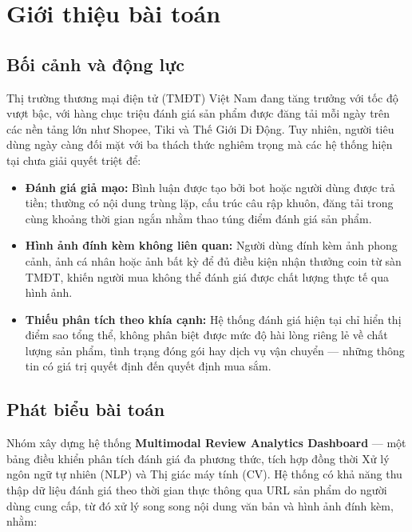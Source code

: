 \section{Giới thiệu bài toán}

\subsection{Bối cảnh và động lực}

Thị trường thương mại điện tử (TMĐT) Việt Nam đang tăng trưởng với tốc độ vượt bậc, với hàng chục triệu đánh giá sản phẩm được đăng tải mỗi ngày trên các nền tảng lớn như Shopee, Tiki và Thế Giới Di Động. Tuy nhiên, người tiêu dùng ngày càng đối mặt với ba thách thức nghiêm trọng mà các hệ thống hiện tại chưa giải quyết triệt để:

\begin{itemize}[labelsep=10pt, leftmargin=2cm]
    \item \textbf{Đánh giá giả mạo:} Bình luận được tạo bởi bot hoặc người dùng được trả tiền; thường có nội dung trùng lặp, cấu trúc câu rập khuôn, đăng tải trong cùng khoảng thời gian ngắn nhằm thao túng điểm đánh giá sản phẩm.
    \item \textbf{Hình ảnh đính kèm không liên quan:} Người dùng đính kèm ảnh phong cảnh, ảnh cá nhân hoặc ảnh bất kỳ để đủ điều kiện nhận thưởng coin từ sàn TMĐT, khiến người mua không thể đánh giá được chất lượng thực tế qua hình ảnh.
    \item \textbf{Thiếu phân tích theo khía cạnh:} Hệ thống đánh giá hiện tại chỉ hiển thị điểm sao tổng thể, không phân biệt được mức độ hài lòng riêng lẻ về chất lượng sản phẩm, tình trạng đóng gói hay dịch vụ vận chuyển --- những thông tin có giá trị quyết định đến quyết định mua sắm.
\end{itemize}

\subsection{Phát biểu bài toán}

Nhóm xây dựng hệ thống \textbf{Multimodal Review Analytics Dashboard} --- một bảng điều khiển phân tích đánh giá đa phương thức, tích hợp đồng thời Xử lý ngôn ngữ tự nhiên (NLP) và Thị giác máy tính (CV). Hệ thống có khả năng thu thập dữ liệu đánh giá theo thời gian thực thông qua URL sản phẩm do người dùng cung cấp, từ đó xử lý song song nội dung văn bản và hình ảnh đính kèm, nhằm:

